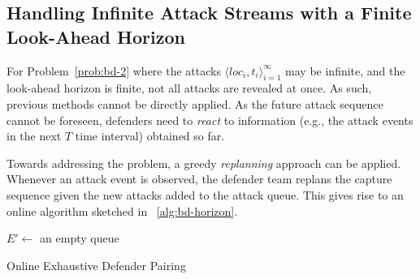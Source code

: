 \subsection{Handling Infinite Attack Streams with a Finite Look-Ahead Horizon }
\label{sec:bd-hor}
For Problem~\ref{prob:bd-2} where the attacks $\big \langle loc_i, t_i\big \rangle_{i=1}^{\infty}$ may be infinite, and the look-ahead horizon is finite, not all attacks are revealed at once. As such, previous methods cannot be directly applied. 
As the future attack sequence cannot be foreseen, defenders need to \emph{react} to information (e.g., the attack events in the next $T$ time interval) obtained so far. 

Towards addressing the problem, a greedy \emph{replanning} approach can be applied. Whenever an attack event is observed, the defender team replans the capture sequence given the new attacks added to the attack queue. 
This gives rise to an online algorithm sketched in ~\ref{alg:bd-horizon}.

\begin{algorithm}[H]
\DontPrintSemicolon
{}
$E'\gets $ an empty queue\;
\vspace{1mm}

\caption{Online Exhaustive Defender Pairing}
\label{alg:bd-horizon}
\end{algorithm}
